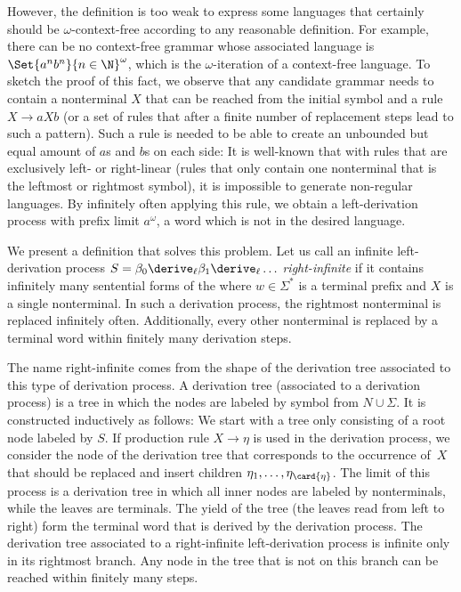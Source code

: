 \documentclass[../../diss.tex]{subfiles}
\begin{document}
However, the definition is too weak to express some languages that certainly should be $\omega$-context-free according to any reasonable definition.
For example, there can be no context-free grammar whose associated language is $\Set{a^n b^n}{n \in \N}^\omega$, which is the $\omega$-iteration of a context-free language.
To sketch the proof of this fact, we observe that any candidate grammar needs to contain a nonterminal $X$ that can be reached from the initial symbol and a rule $X \to aXb$ (or a set of rules that after a finite number of replacement steps lead to such a pattern).
Such a rule is needed to be able to create an unbounded but equal amount of $a$s and $b$s on each side: It is well-known that with rules that are exclusively left- or right-linear (rules that only contain one nonterminal that is the leftmost or rightmost symbol), it is impossible to generate non-regular languages.
By infinitely often applying this rule, we obtain a left-derivation process with prefix limit $a^\omega$, a word which is not in the desired language.

We present a definition that solves this problem.
Let us call an infinite left-derivation process $S = \beta_0 \leftderive \beta_1 \leftderive \ldots$ \emph{right-infinite} if it contains infinitely many sentential forms of the  where $w \in \Sigma^*$ is a terminal prefix and $X$ is a single nonterminal.
In such a derivation process, the rightmost nonterminal is replaced infinitely often.
Additionally, every other nonterminal is replaced by a terminal word within finitely many derivation steps.

The name right-infinite comes from the shape of the derivation tree associated to this type of derivation process.
A derivation tree (associated to a derivation process) is a tree in which the nodes are labeled by symbol from $N \cup \Sigma$.
It is constructed inductively as follows:
We start with a tree only consisting of a root node labeled by $S$.
If production rule $X \to \eta$ is used in the derivation process, we consider the node of the derivation tree that corresponds to the occurrence of~$X$ that should be replaced and insert children $\eta_1, \ldots, \eta_{\card{\eta}}$.
The limit of this process is a derivation tree in which all inner nodes are labeled by nonterminals, while the leaves are terminals.
The yield of the tree (the leaves read from left to right) form the terminal word that is derived by the derivation process.
The derivation tree associated to a right-infinite left-derivation process is infinite only in its rightmost branch.
Any node in the tree that is not on this branch can be reached within finitely many steps.
\end{document}
